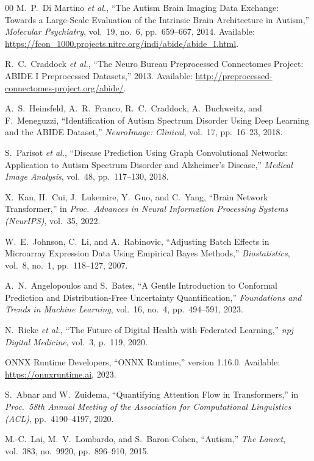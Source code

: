 \documentclass[conference]{IEEEtran}
\begin{document}
\begin{thebibliography}{00}
M.~P.~Di Martino \textit{et al.}, ``The Autism Brain Imaging Data
Exchange: Towards a Large-Scale Evaluation of the Intrinsic Brain
Architecture in Autism,'' \textit{Molecular Psychiatry}, vol.~19,
no.~6, pp.~659--667, 2014. Available:
\url{https://fcon_1000.projects.nitrc.org/indi/abide/abide_I.html}.

R.~C.~Craddock \textit{et al.}, ``The Neuro Bureau Preprocessed Connectomes
Project: ABIDE I Preprocessed Datasets,'' 2013. Available:
\url{http://preprocessed-connectomes-project.org/abide/}.

A.~S.~Heinsfeld, A.~R.~Franco, R.~C.~Craddock, A.~Buchweitz, and
F.~Meneguzzi, ``Identification of Autism Spectrum Disorder Using
Deep Learning and the ABIDE Dataset,'' \textit{NeuroImage: Clinical},
vol.~17, pp.~16--23, 2018.

S.~Parisot \textit{et al.}, ``Disease Prediction Using Graph
Convolutional Networks: Application to Autism Spectrum Disorder and
Alzheimer's Disease,'' \textit{Medical Image Analysis}, vol.~48,
pp.~117--130, 2018.

X.~Kan, H.~Cui, J.~Lukemire, Y.~Guo, and C.~Yang, ``Brain Network
Transformer,'' in \textit{Proc.~Advances in Neural Information
Processing Systems (NeurIPS)}, vol.~35, 2022.

W.~E.~Johnson, C.~Li, and A.~Rabinovic, ``Adjusting Batch Effects in
Microarray Expression Data Using Empirical Bayes Methods,''
\textit{Biostatistics}, vol.~8, no.~1, pp.~118--127, 2007.

A.~N.~Angelopoulos and S.~Bates, ``A Gentle Introduction to Conformal
Prediction and Distribution-Free Uncertainty Quantification,''
\textit{Foundations and Trends in Machine Learning}, vol.~16, no.~4,
pp.~494--591, 2023.

N.~Rieke \textit{et al.}, ``The Future of Digital Health with
Federated Learning,'' \textit{npj Digital Medicine}, vol.~3,
p.~119, 2020.

ONNX Runtime Developers, ``ONNX Runtime,'' version 1.16.0.
Available: \url{https://onnxruntime.ai}, 2023.

S.~Abnar and W.~Zuidema, ``Quantifying Attention Flow in
Transformers,'' in \textit{Proc.~58th Annual Meeting of the
Association for Computational Linguistics (ACL)}, pp.~4190--4197, 2020.

M.-C.~Lai, M.~V.~Lombardo, and S.~Baron-Cohen, ``Autism,''
\textit{The Lancet}, vol.~383, no.~9920, pp.~896--910, 2015.


\end{thebibliography}
\end{document}
